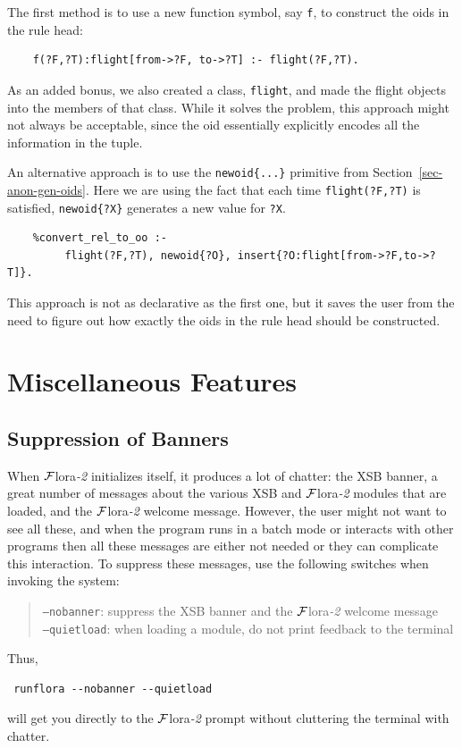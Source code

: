 \documentclass[11pt]{article}
\newcommand{\FLORA}{{\mbox{\sc ${\cal F}${lora}\rm\emph{-2}}}\xspace}
\begin{document}
The first method is to use a new function symbol, say {\tt f}, to construct
the oids in the rule head:
\begin{verbatim}
    f(?F,?T):flight[from->?F, to->?T] :- flight(?F,?T).  
\end{verbatim}
As an added bonus, we also created a class, {\tt flight}, and made the
flight objects into the members of that class. 
While it solves the problem, this approach might not always be acceptable,
since the oid essentially explicitly encodes all the information in the tuple.

An alternative approach is to use the {\tt newoid\{...\}} primitive from
Section~\ref{sec-anon-gen-oids}. Here we are using the fact that each time
{\tt flight(?F,?T)} is satisfied, {\tt newoid\{?X\}} generates a new value for
{\tt ?X}.    
\begin{verbatim}
    %convert_rel_to_oo :-
         flight(?F,?T), newoid{?O}, insert{?O:flight[from->?F,to->?T]}.
\end{verbatim}
This approach is not as declarative as the first one, but it saves the user
from the need to figure out how exactly the oids in the rule head should be
constructed.


\section{Miscellaneous Features}

\subsection{Suppression of Banners}
When \FLORA initializes itself, it produces a lot of chatter: the XSB
banner, a great number of messages about the various XSB and \FLORA modules
that are loaded, and the \FLORA welcome message. However, the user might
not want to see all these, and when the program runs in a batch mode
or interacts with other programs then all these messages are either not
needed or they can complicate this interaction. To suppress these messages,
use the following switches when invoking the system:
\begin{quote}
{\tt --nobanner}: suppress the XSB banner and the \FLORA welcome message\\
{\tt --quietload}: when loading a module, do not print feedback to the terminal
\end{quote}
Thus,
\begin{verbatim}
 runflora --nobanner --quietload  
\end{verbatim}
will get you directly to the \FLORA prompt without cluttering the terminal
with chatter.
\end{document}
